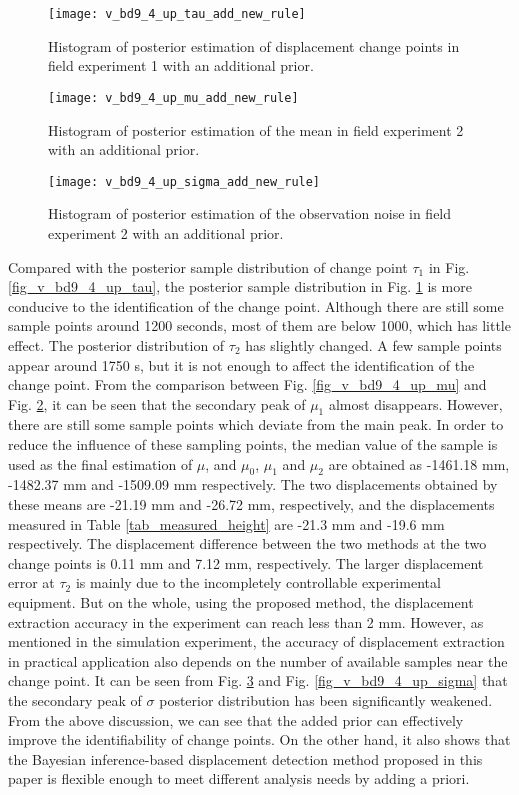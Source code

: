 \documentclass{svjour3}                     %
\begin{document}
\begin{figure}[htbp]
	\centering
	\texttt{[image: v\_bd9\_4\_up\_tau\_add\_new\_rule]}
	\caption{Histogram of posterior estimation of displacement change points in field experiment 1 with an additional prior.}
	\label{fig_v_bd9_4_up_tau_add_new_rule}
\end{figure} 
\begin{figure}[htbp]
	\centering
	\texttt{[image: v\_bd9\_4\_up\_mu\_add\_new\_rule]}
	\caption{Histogram of posterior estimation of the mean in field experiment 2 with an additional prior.}
	\label{fig_v_bd9_4_up_mu_add_new_rule}
\end{figure} 
\begin{figure}[htbp]
	\centering
	\texttt{[image: v\_bd9\_4\_up\_sigma\_add\_new\_rule]}
	\caption{Histogram of posterior estimation of the observation noise in field experiment 2 with an additional prior.}
	\label{fig_v_bd9_4_up_sigma_add_new_rule}
\end{figure}
Compared with the posterior sample distribution of change point $\tau_1$ in Fig. \ref{fig_v_bd9_4_up_tau}, the posterior sample distribution in Fig. \ref{fig_v_bd9_4_up_tau_add_new_rule} is more conducive to the identification of the change point.
Although there are still some sample points around 1200 seconds, most of them are below 1000, which has little effect.
The posterior distribution of $\tau_2$ has slightly changed. A few sample points appear around 1750 s, but it is not enough to affect the identification of the change point.
From the comparison between Fig. \ref{fig_v_bd9_4_up_mu} and Fig. \ref{fig_v_bd9_4_up_mu_add_new_rule}, it can be seen that the secondary peak of $\mu_1$ almost disappears.
However, there are still some sample points which deviate from the main peak.
In order to reduce the influence of these sampling points, the median value of the sample is used as the final estimation of \textbf{$\mu$}, and $\mu_0$, $\mu_1$ and $\mu_2$ are obtained as -1461.18 mm, -1482.37 mm and -1509.09 mm respectively.
The two displacements obtained by these means are -21.19 mm and -26.72 mm, respectively, and the displacements measured in Table \ref{tab_measured_height} are -21.3 mm and -19.6 mm respectively.  The displacement difference between the two methods at the two change points is 0.11 mm and 7.12 mm, respectively. The larger displacement error at $\tau_2$ is mainly due to the incompletely controllable experimental equipment. But on the whole, using the proposed method, the displacement extraction accuracy in the experiment can reach less than 2 mm. However, as mentioned in the simulation experiment, the accuracy of displacement extraction in practical application also depends on the number of available samples near the change point.
It can be seen from Fig. \ref{fig_v_bd9_4_up_sigma_add_new_rule} and Fig. \ref{fig_v_bd9_4_up_sigma} that the secondary peak of $\sigma$ posterior distribution has been significantly weakened.
From the above discussion, we can see that the added prior can effectively improve the identifiability of change points.
On the other hand, it also shows that the Bayesian inference-based displacement detection method proposed in this paper is flexible enough to meet different analysis needs by adding a priori.
\end{document}
